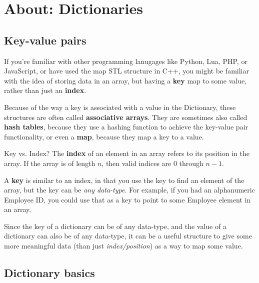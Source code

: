 \documentclass[a4paper,12pt,oneside]{book}
\begin{document}

\tableofcontents

\section{About: Dictionaries}

\subsection{Key-value pairs}

If you're familiar with other programming lanugages like Python,
Lua, PHP, or JavaScript, or have used the map STL structure in C++,
you might be familiar with the idea of storing data in an array,
but having a \textbf{key} map to some value, rather than just
an \textbf{index}.

Because of the way a key is associated with a value in the Dictionary,
these structures are often called \textbf{associative arrays}. They
are sometimes also called \textbf{hash tables}, because they use a
hashing function to achieve the key-value pair functionality,
or even a \textbf{map}, because they map a key to a value.

\begin{hint}{Key vs. Index?}
    The \textbf{index} of an element in an array refers to its position
    in the array. If the array is of length $n$, then valid indices
    are $0$ through $n-1$.

    A \textbf{key} is similar to an index, in that you use the key to
    find an element of the array, but the key can be \textit{any data-type}.
    For example, if you had an alphanumeric Employee ID, you could use
    that as a key to point to some Employee element in an array.
\end{hint}

Since the key of a dictionary can be of any data-type, and the value
of a dictionary can also be of any data-type, it can be a useful
structure to give some more meaningful data (than just \textit{index/position})
as a way to map some value.

\subsection{Dictionary basics}
\end{document}
